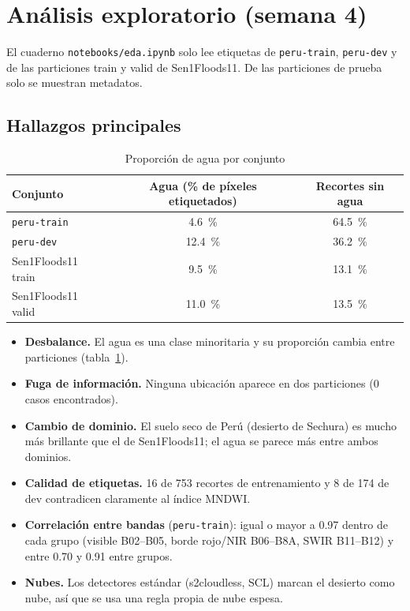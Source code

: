 \section{Análisis exploratorio (semana 4)}
\label{sec:sprint_eda}

El cuaderno \texttt{notebooks/\allowbreak{}eda.ipynb} solo lee etiquetas de \texttt{peru-\allowbreak{}train},
\texttt{peru-\allowbreak{}dev} y de las particiones train y valid de Sen1Floods11. De las particiones de prueba
solo se muestran metadatos.

\subsection{Hallazgos principales}

\begin{table}[H]
    \centering
    \small
    \caption{Proporción de agua por conjunto}
    \label{tab:sprint_balance}
    \begin{tabular}{|l|c|c|}
        \hline
        \textbf{Conjunto} & \textbf{Agua (\% de píxeles etiquetados)} & \textbf{Recortes sin agua} \\
        \hline
        \texttt{peru-\allowbreak{}train} & 4.6~\% & 64.5~\% \\
        \hline
        \texttt{peru-\allowbreak{}dev} & 12.4~\% & 36.2~\% \\
        \hline
        Sen1Floods11 train & 9.5~\% & 13.1~\% \\
        \hline
        Sen1Floods11 valid & 11.0~\% & 13.5~\% \\
        \hline
    \end{tabular}
\end{table}

\begin{itemize}
    \item \textbf{Desbalance.} El agua es una clase minoritaria y su proporción cambia entre
    particiones (tabla~\ref{tab:sprint_balance}).
    \item \textbf{Fuga de información.} Ninguna ubicación aparece en dos particiones (0 casos
    encontrados).
    \item \textbf{Cambio de dominio.} El suelo seco de Perú (desierto de Sechura) es mucho más
    brillante que el de Sen1Floods11; el agua se parece más entre ambos dominios.
    \item \textbf{Calidad de etiquetas.} 16 de 753 recortes de entrenamiento y 8 de 174 de dev
    contradicen claramente al índice MNDWI.
    \item \textbf{Correlación entre bandas} (\texttt{peru-\allowbreak{}train}): igual o mayor a 0.97 dentro de cada
    grupo (visible B02--B05, borde rojo/NIR B06--B8A, SWIR B11--B12) y entre 0.70 y 0.91 entre grupos.
    \item \textbf{Nubes.} Los detectores estándar (s2cloudless, SCL) marcan el desierto como nube, así
    que se usa una regla propia de nube espesa.
\end{itemize}


